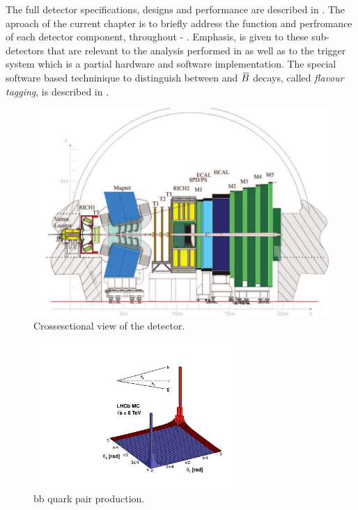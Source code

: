 The full \lhcb detector specifications, designs and performance are described in \cite{jnst}.
The aproach of the current chapter is to briefly address the function and perfromance of each detector component,
throughout  - . Emphasis, is given to these sub-detectors that are relevant
to the analysis performed in  as well as to the trigger system which is a partial hardware
and software implementation. The special software based techninique to distinguish between \B and $\kern 0.18em\overline{\kern -0.18em B}{}$ decays, called
{\it flavour tagging}, is described in \secref{}.

\begin{figure}[t]
  \centering
  \includegraphics[width=\textwidth]{Figures/Chapter2/detector_cross_cmyk}
  \caption{Crossesctional view of the \lhcb detector.}
  \label{lhcb_detector_cross_section}
\end{figure}

\begin{figure}[t]
  \centering
  \includegraphics[width=0.7\textwidth]{Figures/Chapter2/08_rad_acc_scheme_right}
  \caption{bb quark pair production.}
  \label{bb_roduction_angles}
\end{figure}



